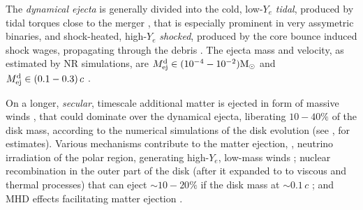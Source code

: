 





The \textit{dynamical ejecta} is generally divided into 
the cold, low-$Y_e$ \textit{tidal}, produced by tidal torques close to the merger 
\citep{Rosswog:1998hy,Radice:2016dwd,Dietrich:2016hky}, that 
is especially prominent in very assymetric binaries, and shock-heated, high-$Y_e$
\textit{shocked}, produced 
by the core bounce induced shock wages, propagating through the \pmerg{} debris 
\citep{Hotokezaka:2013b, Bauswein:2013yna, Sekiguchi:2016bjd, Dietrich:2016hky, Radice:2018pdn}. 
The ejecta mass and velocity, as estimated by \ac{NR} simulations, are 
$M^{\text{d}}_{\text{ej}}\in(10^{-4}-10^{-2}){\text{M}_{\odot}}$ and $M^{\text{d}}_{\text{ej}}\in(0.1-0.3)\,c$ 
\citep{Hotokezaka:2013b,Bauswein:2013yna,Sekiguchi:2016bjd,Radice:2018pdn}.

On a longer, \textit{secular}, timescale additional matter is ejected in form of 
massive winds \citep{Lee:2009,Perego:2014fma,Fernandez:2015use,Siegel:2017nub,
    Fujibayashi:2017puw,Fernandez:2018kax,Miller:2019dpt},%
that could dominate over the dynamical ejecta, liberating $10-40\%$ of the disk mass, 
according to the numerical simulations of the disk evolution 
(see \eg, \citet{Radice:2018xqa} for estimates). Various mechanisms contribute to 
the matter ejection, \eg, neutrino irradiation of the polar region, generating high-$Y_e$, 
low-mass winds \citep{Perego:2014fma,Miller:2019dpt}; nuclear recombination in the outer 
part of the disk (after it expanded to to viscous and thermal processes) that can eject 
${\sim}10-20\%$ if the disk mass at ${\sim}0.1\,c$ \citep{Lee:2009,Fernandez:2015use,Fahlman:2018llv};
and \ac{MHD} effects facilitating matter ejection \citep{Fujibayashi:2017puw,Radice:2018xqa}
.


